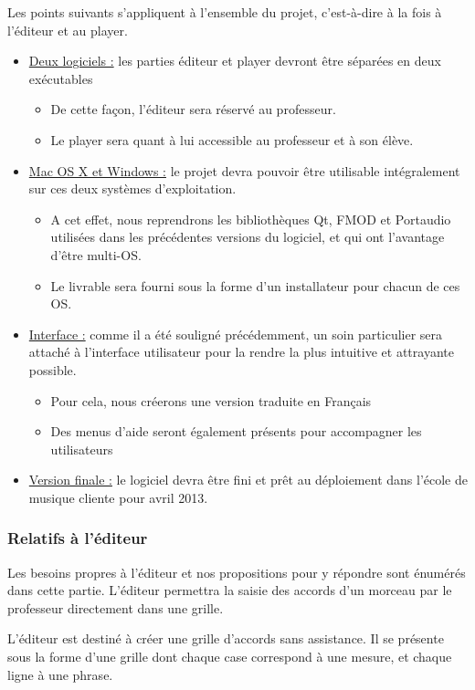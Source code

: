 \documentclass[a4paper,11pt]{article}
\begin{document}
Les points suivants s'appliquent à l'ensemble du projet, c'est-à-dire à la fois à l'éditeur et au player.
\begin{itemize}
 \item \underline{Deux logiciels :} les parties éditeur et player devront être séparées en deux exécutables
 \begin{itemize}
  \item De cette façon, l'éditeur sera réservé au professeur.
  \item Le player sera quant à lui accessible au professeur et à son élève.
 \end{itemize}
 \item \underline{Mac OS X et Windows :} le projet devra pouvoir être utilisable intégralement sur ces deux systèmes d'exploitation.
 \begin{itemize}
  \item A cet effet, nous reprendrons les bibliothèques Qt, FMOD et Portaudio utilisées dans les précédentes versions du logiciel, et qui ont l'avantage d'être multi-OS.
  \item Le livrable sera fourni sous la forme d'un installateur pour chacun de ces OS.
 \end{itemize}
 \item \underline{Interface :} comme il a été souligné précédemment, un soin particulier sera attaché à l'interface utilisateur pour la rendre la plus intuitive et attrayante possible.
 \begin{itemize}
  \item Pour cela, nous créerons une version traduite en Français
  \item Des menus d'aide seront également présents pour accompagner les utilisateurs
 \end{itemize}
 \item \underline{Version finale :} le logiciel devra être fini et prêt au déploiement dans l'école de musique cliente pour avril 2013.
\end{itemize}

\subsubsection*{Relatifs à l'éditeur}

Les besoins propres à l'éditeur et nos propositions pour y répondre sont énumérés dans cette partie. L'éditeur permettra la saisie des accords d'un morceau par le professeur directement dans une grille.

L'éditeur est destiné à créer une grille d'accords sans assistance. Il se présente sous la forme d'une grille dont chaque case correspond à une mesure, et chaque ligne à une phrase.
\end{document}
